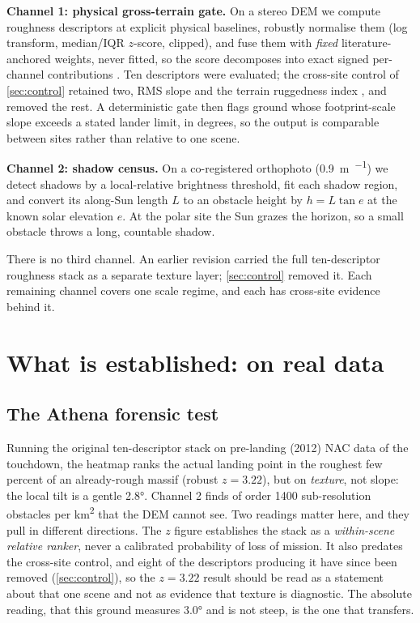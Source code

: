 \documentclass[11pt]{article}
\begin{document}
\textbf{Channel 1: physical gross-terrain gate.} On a stereo DEM we compute roughness
descriptors at explicit physical baselines, robustly normalise them (log transform, median/IQR
$z$-score, clipped), and fuse them with \emph{fixed} literature-anchored weights, never fitted,
so the score decomposes into exact signed per-channel contributions
\autocite{kreslavsky2000,rosenburg2011,kreslavsky2013,caifa2020}. Ten descriptors were evaluated;
the cross-site control of \cref{sec:control} retained two, RMS slope and the terrain ruggedness
index \autocite{riley1999}, and removed the rest. A deterministic gate then flags ground whose
footprint-scale slope exceeds a stated lander limit, in degrees, so the output is comparable
between sites rather than relative to one scene.

\textbf{Channel 2: shadow census.} On a co-registered orthophoto (\SI{0.9}{\meter\per\px})
\autocite{robinson2010,henriksen2017} we detect shadows by a local-relative brightness
threshold, fit each shadow region, and convert its along-Sun length $L$ to an obstacle height
by $h = L\tan e$ at the known solar elevation $e$. At the polar site the Sun grazes the horizon,
so a small obstacle throws a long, countable shadow.

There is no third channel. An earlier revision carried the full ten-descriptor roughness stack as
a separate texture layer; \cref{sec:control} removed it. Each remaining channel covers one scale
regime, and each has cross-site evidence behind it.

\section{What is established: on real data}

\subsection{The Athena forensic test}
Running the original ten-descriptor stack on pre-landing (2012) NAC data of the touchdown, the
heatmap ranks the actual landing point in the roughest few percent of an already-rough massif
(robust $z=3.22$), but on \emph{texture}, not slope: the local tilt is a gentle \ang{2.8}.
Channel 2 finds of order \num{1400} sub-resolution obstacles per \si{\kilo\meter\squared} that
the DEM cannot see. Two readings matter here, and they pull in different directions. The $z$
figure establishes the stack as a \emph{within-scene relative ranker}, never a calibrated
probability of loss of mission. It also predates the cross-site control, and eight of the
descriptors producing it have since been removed (\cref{sec:control}), so the $z=3.22$ result
should be read as a statement about that one scene and not as evidence that texture is
diagnostic. The absolute reading, that this ground measures \ang{3.0} and is not steep, is the
one that transfers.
\end{document}
